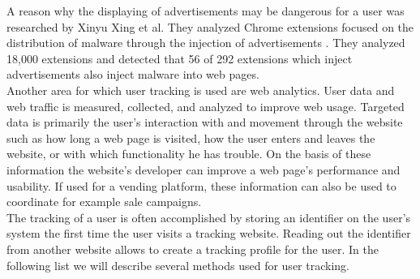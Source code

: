 	A reason why the displaying of advertisements may be dangerous for a user was researched by Xinyu Xing et al. They analyzed Chrome extensions focused on the distribution of malware through the injection of advertisements \cite{Xing:2015:UMT:2736277.2741630}. They analyzed 18,000 extensions and detected that 56 of 292 extensions which inject advertisements also inject malware into web pages. %
	\\
	
	Another area for which user tracking is used are web analytics. User data and web traffic is measured, collected, and analyzed to improve web usage. Targeted data is primarily the user's interaction with and movement through the website such as how long a web page is visited, how the user enters and leaves the website, or with which functionality he has trouble. On the basis of these information the website's developer can improve a web page's performance and usability. If used for a vending platform, these information can also be used to coordinate for example sale campaigns. \\
	
	The tracking of a user is often accomplished by storing an identifier on the user's system the first time the user visits a tracking website. Reading out the identifier from another website allows to create a tracking profile for the user. In the following list we will describe several methods used for user tracking. \\


